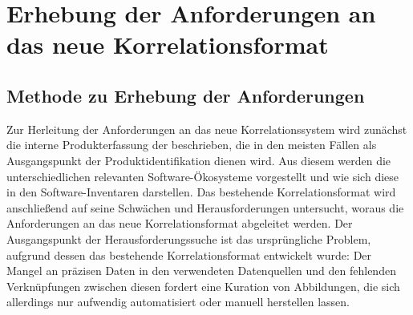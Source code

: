 \chapter{Erhebung der Anforderungen an das neue Korrelationsformat}\label{ch:anforderungen}


\section{Methode zu Erhebung der Anforderungen}

Zur Herleitung der Anforderungen an das neue Korrelationssystem wird zunächst die interne Produkterfassung der \metaeffektsp beschrieben, die in den meisten Fällen als Ausgangspunkt der Produktidentifikation dienen wird.
Aus diesem werden die unterschiedlichen relevanten Software-Ökosysteme vorgestellt und wie sich diese in den Software-Inventaren darstellen.
Das bestehende Korrelationsformat wird anschließend auf seine Schwächen und Herausforderungen untersucht, woraus die Anforderungen an das neue Korrelationsformat abgeleitet werden.
Der Ausgangspunkt der Herausforderungssuche ist das ursprüngliche Problem, aufgrund dessen das bestehende Korrelationsformat entwickelt wurde:
Der Mangel an präzisen Daten in den verwendeten Datenquellen und den fehlenden Verknüpfungen zwischen diesen fordert eine Kuration von Abbildungen, die sich allerdings nur aufwendig automatisiert oder manuell herstellen lassen.











